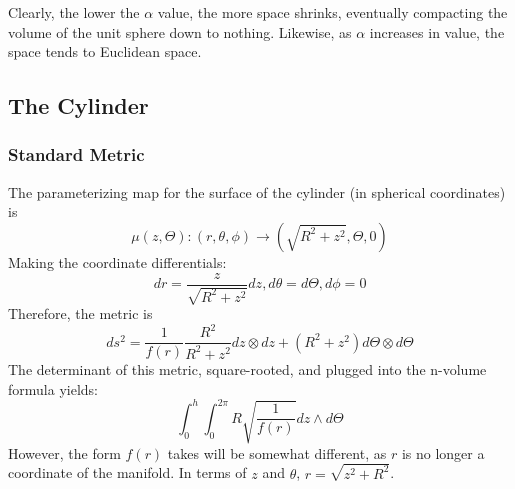 \documentclass{article}
\begin{document}
Clearly, the lower the $\alpha$ value, the more space shrinks, eventually compacting the volume of the unit sphere down to nothing. Likewise, as $\alpha$ increases in value, the space tends to Euclidean space.

\newpage
\subsection{The Cylinder}
\subsubsection{Standard Metric}
The parameterizing map for the surface of the cylinder (in spherical coordinates) is
\[
\mu(z, \Theta): (r, \theta, \phi) \rightarrow (\sqrt{R^2 + z^2}, \Theta, 0)
\]
Making the coordinate differentials:
\[
dr = \frac{z}{\sqrt{R^2+z^2}}dz, d\theta = d\Theta, d\phi = 0
\]
Therefore, the metric is
\[
ds^2 = \frac{1}{f(r)}\frac{R^2}{R^2+z^2} dz \otimes dz + (R^2 + z^2) d\Theta \otimes d\Theta
\]
The determinant of this metric, square-rooted, and plugged into the n-volume formula yields:
\[
\int_0^h\int_0^{2\pi} R\sqrt{\frac{1}{f(r)}} dz \wedge d\Theta
\]
However, the form $f(r)$ takes will be somewhat different, as $r$ is no longer a coordinate of the manifold. In terms of $z$ and $\theta$, $r=\sqrt{z^2 + R^2}$.
\end{document}
